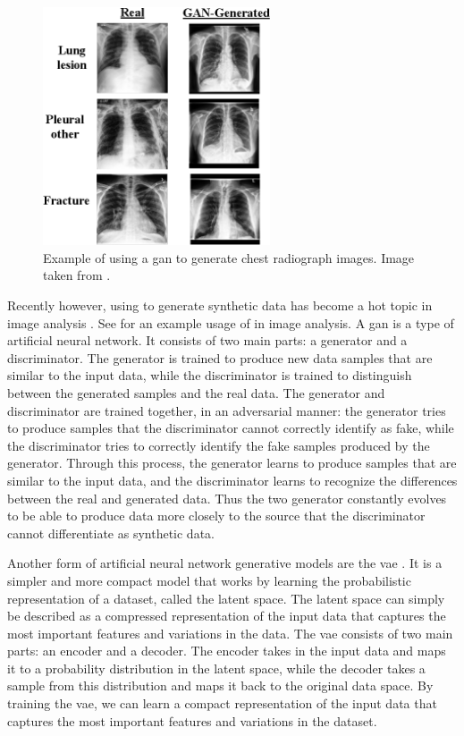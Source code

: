 \documentclass[12pt, letterpaper]{article}
\begin{document}
\begin{figure}[t]
    \centering
    \includegraphics[width=0.6\textwidth]{figures/gan-xray.png}
    \caption{Example of using a \acrfull{gan} to generate chest radiograph images. Image taken from \cite{sundaram_gan-based_2021}.}
    \label{fig:gan-xray}
\end{figure}

Recently however, using  to generate synthetic data has become a hot topic in image analysis \cite{pavan_kumar_generative_2021}. See  for an example usage of  in image analysis. A \acrshort{gan} is a type of artificial neural network. It consists of two main parts: a generator and a discriminator. The generator is trained to produce new data samples that are similar to the input data, while the discriminator is trained to distinguish between the generated samples and the real data. The generator and discriminator are trained together, in an adversarial manner: the generator tries to produce samples that the discriminator cannot correctly identify as fake, while the discriminator tries to correctly identify the fake samples produced by the generator. Through this process, the generator learns to produce samples that are similar to the input data, and the discriminator learns to recognize the differences between the real and generated data. Thus the two generator constantly evolves to be able to produce data more closely to the source that the discriminator cannot differentiate as synthetic data.

Another form of artificial neural network generative models are the \acrfull{vae} \cite{kingma_auto-encoding_2013}. It is a simpler and more compact model that works by learning the probabilistic representation of a dataset, called the latent space. The latent space can simply be described as a compressed representation of the input data that captures the most important features and variations in the data. The \acrshort{vae} consists of two main parts: an encoder and a decoder. The encoder takes in the input data and maps it to a probability distribution in the latent space, while the decoder takes a sample from this distribution and maps it back to the original data space. By training the \acrshort{vae}, we can learn a compact representation of the input data that captures the most important features and variations in the dataset.
\end{document}
